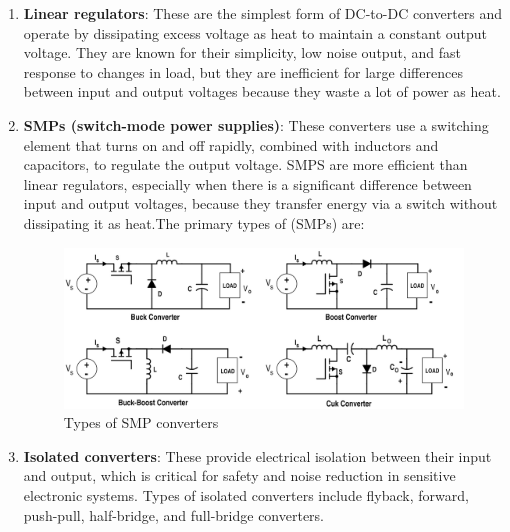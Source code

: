 \begin{enumerate}
    \item \textbf{Linear regulators}: These are the simplest form of DC-to-DC converters and operate by dissipating excess voltage as heat to maintain a constant output voltage. They are known for their simplicity, low noise output, and fast response to changes in load, but they are inefficient for large differences between input and output voltages because they waste a lot of power as heat.
    \item \textbf{SMPs (switch-mode power supplies)}: These converters use a switching element that turns on and off rapidly, combined with inductors and capacitors, to regulate the output voltage. SMPS are more efficient than linear regulators, especially when there is a significant difference between input and output voltages, because they transfer energy via a switch without dissipating it as heat.The primary types of (SMPs) are:
    \begin{figure}[H]
        \centering
        \includegraphics[scale=0.25]{figs/ch03/SMPS.png}
        \caption{Types of SMP converters}
    \end{figure}
    \item \textbf{Isolated converters}: These provide electrical isolation between their input and output, which is critical for safety and noise reduction in sensitive electronic systems. Types of isolated converters include flyback, forward, push-pull, half-bridge, and full-bridge converters. 
\end{enumerate}

